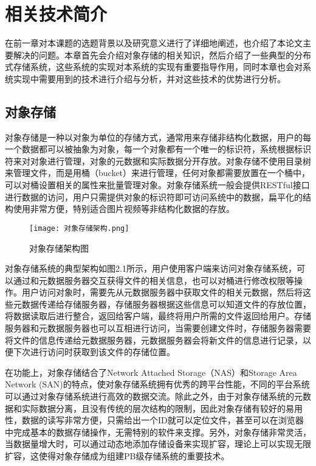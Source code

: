 
\chapter{相关技术简介}
在前一章对本课题的选题背景以及研究意义进行了详细地阐述，也介绍了本论文主要解决的问题。本章首先会介绍对象存储的相关知识，然后介绍了一些典型的分布式存储系统，这些系统的实现对本系统的实现有重要指导作用，同时本章也会对系统实现中需要用到的技术进行介绍与分析，并对这些技术的优势进行分析。
\section{对象存储}%
对象存储是一种以对象为单位的存储方式，通常用来存储非结构化数据，用户的每一个数据都可以被抽象为对象，每一个对象都有一个唯一的标识符，系统根据标识符来对对象进行管理，对象的元数据和实际数据分开存放。对象存储不使用目录树来管理文件，而是用桶（bucket）来进行管理，任何对象都需要放置在一个桶中，可以对桶设置相关的属性来批量管理对象。对象存储系统一般会提供RESTful接口进行数据的访问，用户只需提供对象的标识符即可访问系统中的数据，扁平化的结构使用非常方便，特别适合图片视频等非结构化数据的存放。
\begin{figure}
    \centering
    \texttt{[image: 对象存储架构.png]}
    \caption{对象存储架构图}
\end{figure}

对象存储系统的典型架构如图2.1所示，用户使用客户端来访问对象存储系统，可以通过和元数据服务器交互获得文件的相关信息，也可以对桶进行修改权限等操作。用户访问对象时，需要先从元数据服务器中获取文件的相关元数据，然后将这些元数据传递给存储服务器，存储服务器根据这些信息可以知道文件的存放位置，将数据读取后进行整合，返回给客户端，最终将用户所需的文件返回给用户。存储服务器和元数据服务器也可以互相进行访问，当需要创建文件时，存储服务器需要将文件的信息传递给元数据服务器，元数据服务器会将新文件的信息进行记录，以便下次进行访问时获取到该文件的存储位置。

在功能上，对象存储结合了Network Attached Storage\cite{33}（NAS）和Storage Area Network\cite{34} (SAN)的特点，使对象存储系统拥有优秀的跨平台性能\cite{35}，不同的平台系统可以通过对象存储系统进行高效的数据交流。除此之外，由于对象存储系统的元数据和实际数据分离，且没有传统的层次结构的限制，因此对象存储有较好的易用性，数据的读写非常方便，只需给出一个ID就可以定位文件，甚至可以在浏览器中完成基本的数据存储操作，无需特别的软件来支撑。另外，对象存储非常灵活，当数据量增大时，可以通过动态地添加存储设备来实现扩容，理论上可以实现无限扩容，这使得对象存储成为组建PB级存储系统的重要技术。


